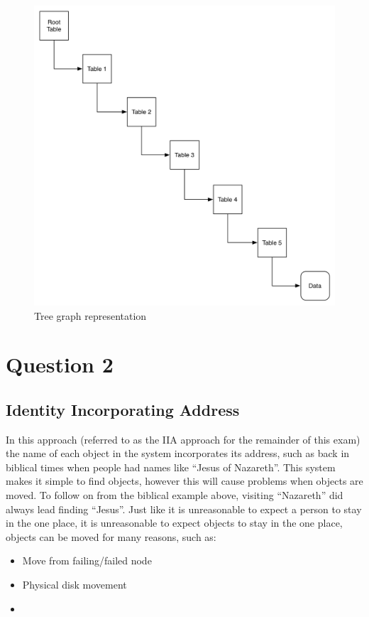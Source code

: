 \documentclass[a4paper,12pt]{article}
\begin{document}
\begin{figure}[ht!]
    \centering
    \includegraphics[width=125mm]{./images/PageTables}
    \caption{Tree graph representation}
    \label{img:tableGraph}
\end{figure}

%

\section*{Question 2}
\subsection*{Identity Incorporating Address}
In this approach (referred to as the IIA approach for the remainder of this exam) the name of each object in the system incorporates its address, such as back in biblical times when people had names like ``Jesus of Nazareth''. 
This system makes it simple to find objects, however this will cause problems when objects are moved.
To follow on from the biblical example above, visiting ``Nazareth'' did always lead finding ``Jesus''.
Just like it is unreasonable to expect a person to stay in the one place, it is unreasonable to expect objects to stay in the one place, objects can be moved for many reasons, such as:
\begin{itemize}
    \item{Move from failing/failed node}
    \item{Physical disk movement}
    \item{}
\end{itemize}
\end{document}
